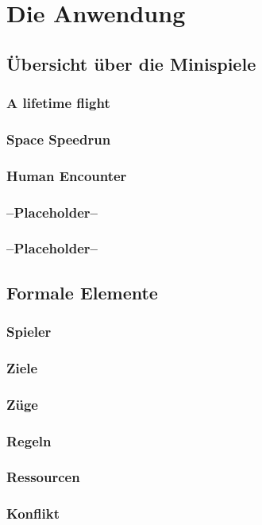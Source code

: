 \documentclass{Ausarbeitung}
\begin{document}
\section{Die Anwendung}
\label{anwendung}
	\subsection{Übersicht über die Minispiele}
	\label{minispiele}
		\subsubsection{A lifetime flight}
		\subsubsection{Space Speedrun}
		\subsubsection{Human Encounter}
		\subsubsection{--Placeholder--}
		\subsubsection{--Placeholder--}
	\subsection{Formale Elemente}
	\label{formElemente}
		\subsubsection{Spieler}
		\subsubsection{Ziele}
		\label{formZiele}
		\subsubsection{Züge}
		\subsubsection{Regeln}
		\subsubsection{Ressourcen}
		\subsubsection{Konflikt}
\end{document}
